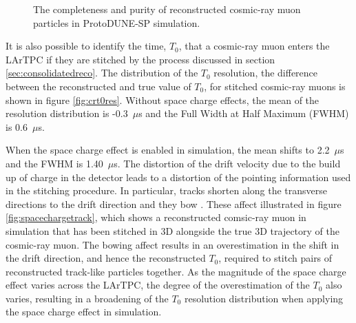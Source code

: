 \begin{figure}
\caption{The \protect{} completeness and \protect{} purity of reconstructed cosmic-ray muon particles in ProtoDUNE-SP simulation.}
\label{fig:crrecopurcom}
\end{figure}

It is also possible to identify the time, $T_{0}$, that a cosmic-ray muon enters the LArTPC if they are stitched by the process discussed in section \ref{sec:consolidatedreco}.  The distribution of the $T_{0}$ resolution, the difference between the reconstructed and true value of $T_{0}$, for stitched cosmic-ray muons is shown in figure \ref{fig:crt0res}.  Without space charge effects, the mean of the resolution distribution is -0.3~$\mu$s and the Full Width at Half Maximum (FWHM) is 0.6~$\mu$s.  

When the space charge effect is enabled in simulation, the mean shifts to 2.2~$\mu$s and the FWHM is 1.40~$\mu$s.  The distortion of the drift velocity due to the build up of charge in the detector leads to a distortion of the pointing information used in the stitching procedure.  In particular, tracks shorten along the transverse directions to the drift direction and they bow \cite{spacecharge}.  These affect illustrated in figure \ref{fig:spacechargetrack}, which shows a reconstructed comsic-ray muon in simulation that has been stitched in 3D alongside the true 3D trajectory of the cosmic-ray muon.  The bowing affect results in an overestimation in the shift in the drift direction, and hence the reconstructed $T_{0}$, required to stitch pairs of reconstructed track-like particles together.  As the magnitude of the space charge effect varies across the LArTPC, the degree of the overestimation of the $T_{0}$ also varies, resulting in a broadening of the $T_{0}$ resolution distribution when applying the space charge effect in simulation. 

